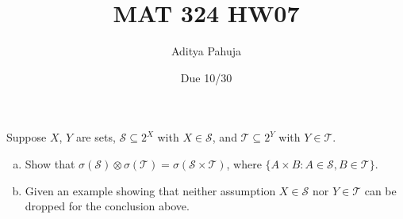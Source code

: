 \documentclass[10pt]{article}
\title{MAT 324 HW07}
\author{\large Aditya Pahuja}
\date{\large Due 10/30}
\providecommand{\ii}{\item}
\begin{document}
\maketitle

\begin{problem}
    Suppose $X$, $Y$ are sets, $\mathcal S\subseteq 2^X$ with $X\in\mathcal S$,
    and $\mathcal T\subseteq 2^Y$ with $Y\in\mathcal T$.
    \begin{enumerate}[(a)]
        \ii Show that $\sigma(\mathcal S)\otimes\sigma(\mathcal T) =
	\sigma(\mathcal S\times\mathcal T)$, where
	$\{A\times B : A\in\mathcal S, B\in\mathcal T\}$.
	\ii Given an example showing that neither assumption $X\in\mathcal S$
	nor $Y\in\mathcal T$ can be dropped for the conclusion above.
    \end{enumerate}
\end{problem}
\end{document}
